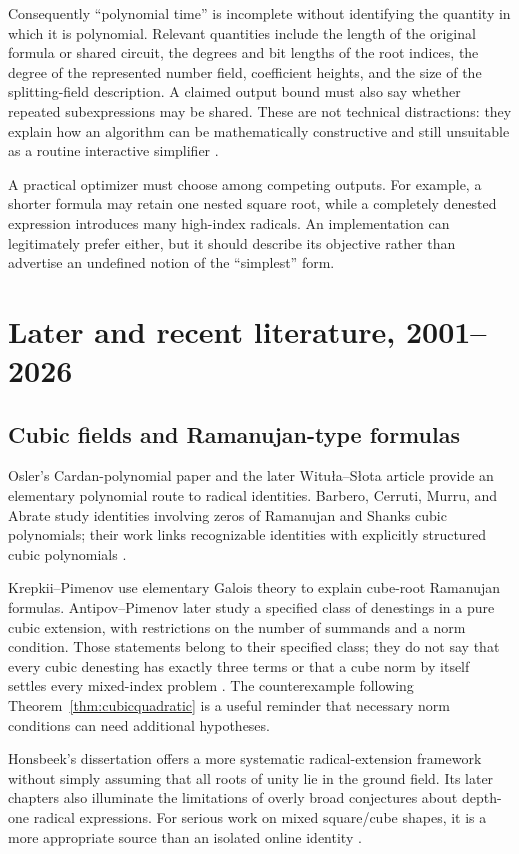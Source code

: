 \documentclass[11pt,letterpaper]{article}
\numberwithin{equation}{section}
\theoremstyle{definition}
\theoremstyle{remark}
\begin{document}
Consequently ``polynomial time'' is incomplete without identifying the quantity in which it is polynomial. Relevant quantities include the length of the original formula or shared circuit, the degrees and bit lengths of the root indices, the degree of the represented number field, coefficient heights, and the size of the splitting-field description. A claimed output bound must also say whether repeated subexpressions may be shared. These are not technical distractions: they explain how an algorithm can be mathematically constructive and still unsuitable as a routine interactive simplifier \cite{bfht,blomerthesis,blomer2000}.

A practical optimizer must choose among competing outputs. For example, a shorter formula may retain one nested square root, while a completely denested expression introduces many high-index radicals. An implementation can legitimately prefer either, but it should describe its objective rather than advertise an undefined notion of the ``simplest'' form.

\section{Later and recent literature, 2001--2026}\label{sec:recent}

\subsection{Cubic fields and Ramanujan-type formulas}
Osler's Cardan-polynomial paper and the later Witu\l a--S\l ota article provide an elementary polynomial route to radical identities. Barbero, Cerruti, Murru, and Abrate study identities involving zeros of Ramanujan and Shanks cubic polynomials; their work links recognizable identities with explicitly structured cubic polynomials \cite{osler,witula,barbero}.

Krepkii--Pimenov use elementary Galois theory to explain cube-root Ramanujan formulas. Antipov--Pimenov later study a specified class of denestings in a pure cubic extension, with restrictions on the number of summands and a norm condition. Those statements belong to their specified class; they do not say that every cubic denesting has exactly three terms or that a cube norm by itself settles every mixed-index problem \cite{krepkii,antipov}. The counterexample following Theorem~\ref{thm:cubicquadratic} is a useful reminder that necessary norm conditions can need additional hypotheses.

Honsbeek's dissertation offers a more systematic radical-extension framework without simply assuming that all roots of unity lie in the ground field. Its later chapters also illuminate the limitations of overly broad conjectures about depth-one radical expressions. For serious work on mixed square/cube shapes, it is a more appropriate source than an isolated online identity \cite{honsbeek}.
\end{document}
